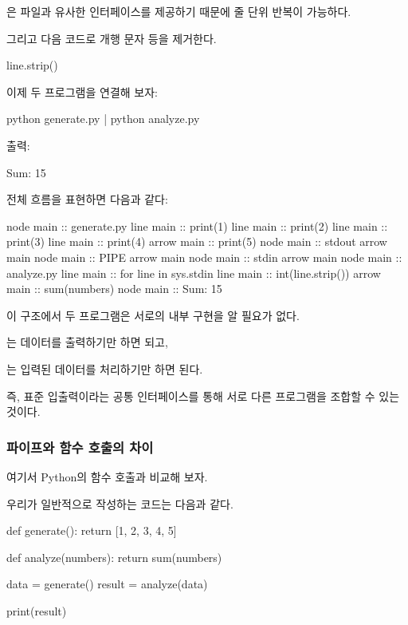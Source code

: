 은 파일과 유사한 인터페이스를 제공하기 때문에 줄 단위 반복이 가능하다.

그리고 다음 코드로 개행 문자 등을 제거한다.

\begin{dhkcode}
line.strip()
\end{dhkcode}

이제 두 프로그램을 연결해 보자:

\begin{dhkzsh}
python generate.py | python analyze.py
\end{dhkzsh}

출력:

\begin{dhkzsh}
Sum: 15
\end{dhkzsh}

전체 흐름을 표현하면 다음과 같다:

\begin{dhkbranch}[in=8]
node main :: generate.py
line main :: print(1)
line main :: print(2)
line main :: print(3)
line main :: print(4)
arrow main :: print(5)
node main :: stdout
arrow main
node main :: PIPE
arrow main
node main :: stdin
arrow main
node main :: analyze.py
line main :: for line in sys.stdin
line main :: int(line.strip())
arrow main :: sum(numbers)
node main :: Sum: 15
\end{dhkbranch}

이 구조에서 두 프로그램은 서로의 내부 구현을 알 필요가 없다.

는 데이터를 출력하기만 하면 되고,

는 입력된 데이터를 처리하기만 하면 된다.

즉, 표준 입출력이라는 공통 인터페이스를 통해 서로 다른 프로그램을 조합할 수 있는 것이다.

\subsubsection{파이프와 함수 호출의 차이}

여기서 Python의 함수 호출과 비교해 보자.

우리가 일반적으로 작성하는 코드는 다음과 같다.

\begin{dhkcode}
def generate():
    return [1, 2, 3, 4, 5]


def analyze(numbers):
    return sum(numbers)


data = generate()
result = analyze(data)

print(result)
\end{dhkcode}

